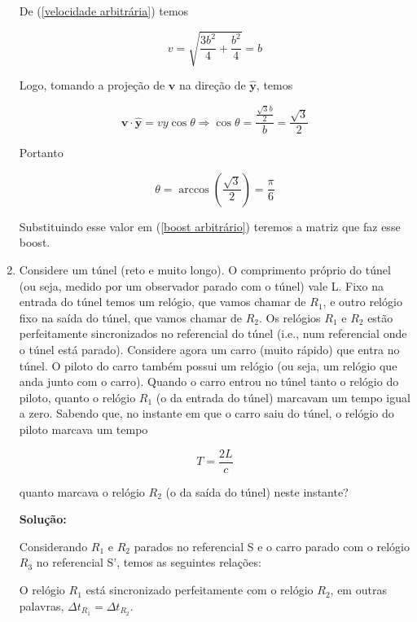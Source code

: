 \documentclass[10pt,a4paper]{article}
\begin{document}
\begin{enumerate}
De (\ref{velocidade arbitrária}) temos 

\begin{equation}
v = \sqrt{\frac{3b^2}{4}+\frac{b^2}{4}} = b
\end{equation}

Logo, tomando a projeção de $\mathbf{v}$ na direção de $\mathbf{\hat{y}}$, temos 

\begin{equation}
\mathbf{v}\cdot\mathbf{\hat{y}} = vy\cos\theta \Rightarrow \cos\theta = \frac{\frac{\sqrt{3}b}{2} }{b} = \frac{\sqrt{3}}{2}
\end{equation}

Portanto 

\begin{equation}
\theta = \arccos\left(\frac{\sqrt{3}}{2}\right) = \frac{\pi}{6}
\end{equation}
	
	
Substituindo esse valor em (\ref{boost arbitrário}) teremos a matriz que faz esse boost.
	\item Considere um túnel (reto e muito longo). O comprimento próprio do túnel (ou seja, medido por um observador parado com o túnel) vale L. Fixo na entrada do túnel temos um relógio, que vamos chamar de $R_1$, e outro relógio fixo na saída do túnel, que vamos chamar de $R_2$. Os relógios $R_1$ e $R_2$ estão perfeitamente sincronizados no referencial do túnel (i.e., num referencial onde o túnel está parado). Considere agora um carro (muito rápido) que entra no túnel. O piloto do carro também possui um relógio (ou seja, um relógio que anda junto com o carro). Quando o carro entrou no túnel tanto o relógio do piloto, quanto o relógio $R_1$ (o da entrada do túnel) marcavam um tempo igual a zero. Sabendo que, no instante em que o carro saiu do túnel, o relógio do piloto marcava um tempo
	
	\begin{equation}
	T = \frac{2L}{c}
	\end{equation}
	
	quanto marcava o relógio $R_2$ (o da saída do túnel) neste instante?
	
	\textbf{Solução:}
	
	Considerando $ R_1 $ e $ R_2 $ parados no referencial S e o carro parado com o relógio $ R_3 $ no referencial S', temos as seguintes relações:
	
	O relógio $ R_1 $ está sincronizado perfeitamente com o relógio $ R_2 $, em outras palavras, $ \Delta t_{R_1} = \Delta t_{R_2}$.
	

\end{enumerate}
\end{document}
